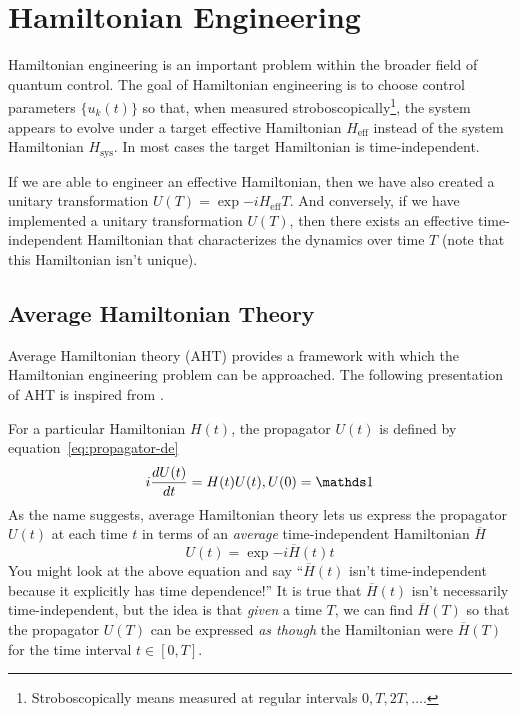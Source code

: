 \section{Hamiltonian Engineering}

Hamiltonian engineering is an important problem within the broader field of quantum control. The goal of Hamiltonian engineering is to choose control parameters $\{u_k(t)\}$ so that, when measured stroboscopically\footnote{Stroboscopically means measured at regular intervals $0, T, 2T, \dots$.}, the system appears to evolve under a target effective Hamiltonian $H_{\text{eff}}$ instead of the system Hamiltonian $H_{\text{sys}}$. In most cases the target Hamiltonian is time-independent.

If we are able to engineer an effective Hamiltonian, then we have also created a unitary transformation $U(T) = \exp{-i H_{\text{eff}} T}$. And conversely, if we have implemented a unitary transformation $U(T)$, then there exists an effective time-independent Hamiltonian that characterizes the dynamics over time $T$ (note that this Hamiltonian isn't unique).

\subsection{Average Hamiltonian Theory}\label{sec:AHT}

Average Hamiltonian theory (AHT) provides a framework with which the Hamiltonian engineering problem can be approached. The following presentation of AHT is inspired from \cite{brinkmann_2016, gerstein-dybowski, 1976ii}.

For a particular Hamiltonian $H(t)$, the propagator $U(t)$ is defined by equation~\ref{eq:propagator-de}
\[
i \ddt{U(t)} = H(t) U(t), U(0) = \identity
\]
As the name suggests, average Hamiltonian theory lets us express the propagator $U(t)$ at each time $t$ in terms of an \emph{average} time-independent Hamiltonian $\overline{H}$
\[
U(t) = \exp{-i \overline{H}(t) t}
\]
You might look at the above equation and say ``$\overline{H}(t)$ isn't time-independent because it explicitly has time dependence!'' It is true that $\overline{H}(t)$ isn't necessarily time-independent, but the idea is that \emph{given} a time $T$, we can find $\overline{H}(T)$ so that the propagator $U(T)$ can be expressed \emph{as though} the Hamiltonian were $\overline{H}(T)$ for the time interval $t \in [0, T]$.


